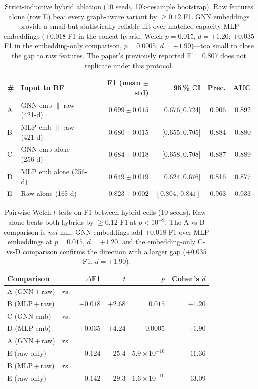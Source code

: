 \begin{table}[htbp]
\centering
\caption{Strict-inductive hybrid ablation (10 seeds, 10k-resample
  bootstrap).  Raw features alone (row E) beat every graph-aware
  variant by $\geq 0.12$ F1.  GNN embeddings provide a small but
  statistically reliable lift over matched-capacity MLP embeddings
  ($+0.018$ F1 in the concat hybrid, Welch $p = 0.015$, $d = +1.20$;
  $+0.035$ F1 in the embedding-only comparison, $p = 0.0005$,
  $d = +1.90$)---too small to close the gap to raw features.  The
  paper's previously reported F1\,=\,0.807 does not replicate under
  this protocol.}
\label{tab:hybrid}
\small
\begin{tabular}{llrrrr}
\toprule
\textbf{\#} & \textbf{Input to RF}
  & \textbf{F1 (mean $\pm$ std)}
  & \textbf{95\,\% CI}
  & \textbf{Prec.} & \textbf{AUC} \\
\midrule
A & GNN emb $\|$ raw (421-d)
    & $0.699 \pm 0.015$ & [0.676,\,0.724] & 0.906 & 0.892 \\
B & MLP emb $\|$ raw (421-d)
    & $0.680 \pm 0.015$ & [0.655,\,0.705] & 0.884 & 0.880 \\
C & GNN emb alone   (256-d)
    & $0.684 \pm 0.018$ & [0.658,\,0.708] & 0.887 & 0.889 \\
D & MLP emb alone   (256-d)
    & $0.649 \pm 0.019$ & [0.624,\,0.676] & 0.816 & 0.877 \\
E & Raw alone       (165-d)
    & $\mathbf{0.823 \pm 0.002}$ & $\mathbf{[0.804,\,0.841]}$
    & $\mathbf{0.963}$ & $\mathbf{0.933}$ \\
\bottomrule
\end{tabular}
\end{table}

\begin{table}[htbp]
\centering
\caption{Pairwise Welch $t$-tests on F1 between hybrid cells
  (10 seeds).  Raw-alone beats both hybrids by $\geq 0.12$ F1 at
  $p < 10^{-9}$.  The A-vs-B comparison is \emph{not} null: GNN
  embeddings add $+0.018$ F1 over MLP embeddings at $p = 0.015$,
  $d = +1.20$, and the embedding-only C-vs-D comparison confirms
  the direction with a larger gap ($+0.035$ F1, $d = +1.90$).}
\label{tab:hybrid_welch}
\small
\begin{tabular}{llrrrr}
\toprule
\textbf{Comparison} & & \textbf{$\Delta$F1} & \textbf{$t$} & \textbf{$p$} & \textbf{Cohen's $d$} \\
\midrule
A (GNN\,+\,raw)  & vs. & & & & \\
B (MLP\,+\,raw)  & ~~~  & $+0.018$ & $+2.68$ & $0.015$   & $+1.20$ \\
C (GNN emb)      & vs. & & & & \\
D (MLP emb)      & ~~~  & $+0.035$ & $+4.24$ & $0.0005$  & $+1.90$ \\
A (GNN\,+\,raw)  & vs. & & & & \\
E (raw only)     & ~~~  & $-0.124$ & $-25.4$ & $5.9{\times}10^{-10}$ & $-11.36$ \\
B (MLP\,+\,raw)  & vs. & & & & \\
E (raw only)     & ~~~  & $-0.142$ & $-29.3$ & $1.6{\times}10^{-10}$ & $-13.09$ \\
\bottomrule
\end{tabular}
\end{table}

